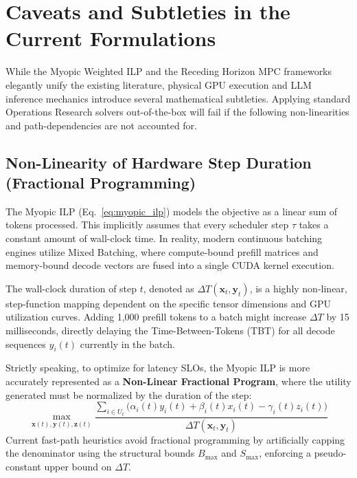 \documentclass[11pt]{article}
\begin{document}
\section{Caveats and Subtleties in the Current Formulations}
\label{sec:caveats_subtleties}

While the Myopic Weighted ILP and the Receding Horizon MPC frameworks elegantly unify the existing literature, physical GPU execution and LLM inference mechanics introduce several mathematical subtleties. Applying standard Operations Research solvers out-of-the-box will fail if the following non-linearities and path-dependencies are not accounted for.

\subsection{Non-Linearity of Hardware Step Duration (Fractional Programming)}
\label{subsec:caveat_step_duration}

The Myopic ILP (Eq.~\ref{eq:myopic_ilp}) models the objective as a linear sum of tokens processed. This implicitly assumes that every scheduler step $\tau$ takes a constant amount of wall-clock time. In reality, modern continuous batching engines utilize Mixed Batching, where compute-bound prefill matrices and memory-bound decode vectors are fused into a single CUDA kernel execution.

The wall-clock duration of step $t$, denoted as $\Delta T(\mathbf{x}_t, \mathbf{y}_t)$, is a highly non-linear, step-function mapping dependent on the specific tensor dimensions and GPU utilization curves. Adding 1,000 prefill tokens to a batch might increase $\Delta T$ by 15 milliseconds, directly delaying the Time-Between-Tokens (TBT) for all decode sequences $y_i(t)$ currently in the batch. 

Strictly speaking, to optimize for latency SLOs, the Myopic ILP is more accurately represented as a \textbf{Non-Linear Fractional Program}, where the utility generated must be normalized by the duration of the step:
\begin{equation}
    \max_{\mathbf{x}(t), \mathbf{y}(t), \mathbf{z}(t)} \frac{\sum_{i \in U_t} \Big( \alpha_i(t) y_i(t) + \beta_i(t) x_i(t) - \gamma_i(t) z_i(t) \Big)}{\Delta T(\mathbf{x}_t, \mathbf{y}_t)}
\end{equation}
Current fast-path heuristics avoid fractional programming by artificially capping the denominator using the structural bounds $B_{\max}$ and $S_{\max}$, enforcing a pseudo-constant upper bound on $\Delta T$.
\end{document}
